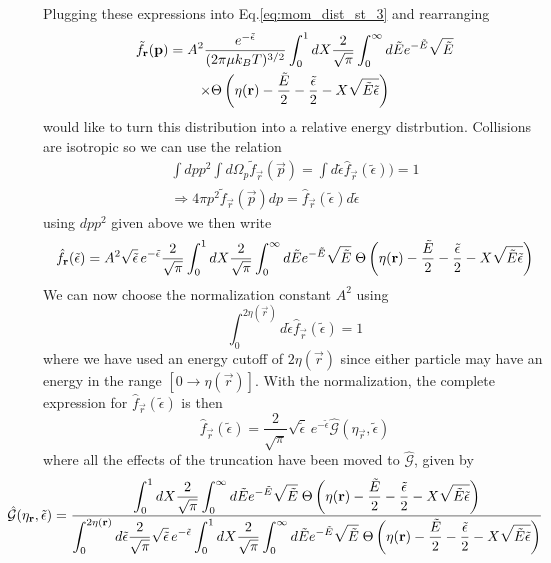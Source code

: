 Plugging these expressions into Eq.\ref{eq:mom_dist_st_3} and rearranging
\begin{multline}
	\tilde{f}_{\mathbf{r}}(\mathbf{p}) = A^2 \frac{e^{-\tilde{\epsilon}}}{(2 \pi \mu k_B T)^{3/2}} \int_0^1 dX \frac{2}{\sqrt{\pi}} \int_0^\infty d \tilde{E} e^{-\tilde{E}}\sqrt{\tilde{E}} \\
	\times \Theta \left( {\eta(\mathbf{r}) - \frac{\tilde{E}}{2} - \frac{\tilde{\epsilon}}{2} - X \sqrt{\tilde{E}\tilde{\epsilon}}} \right)
\end{multline}
would like to turn this distribution into a relative energy distrbution. 
Collisions are isotropic so we can use the relation
\begin{equation}
\begin{split}
	\int dp p^2 \int d \Omega_p \tilde{f}_{\vec{r}}(\vec{p}) = \int d \tilde{\epsilon} \hat{f}_{\vec{r}}(\tilde{\epsilon})) = 1 \\
	\Rightarrow 4 \pi p^2 \tilde{f}_{\vec{r}}(\vec{p}) dp = \hat{f}_{\vec{r}}(\tilde{\epsilon}) d \tilde{\epsilon}
\end{split}
\end{equation}
using $dp p^2$ given above we then write 
\begin{equation} \label{eq:mom_dist_st_4}
	\hat{f}_{\mathbf{r}}(\tilde{\epsilon}) = A^2 \sqrt{\tilde{\epsilon}} \, e^{-\tilde{\epsilon}} \frac{2}{\sqrt{\pi}} \int_0^1 dX \frac{2}{\sqrt{\pi}} \int_0^\infty d \tilde{E} e^{-\tilde{E}}\sqrt{\tilde{E}} \; \Theta \left( {\eta(\mathbf{r}) - \frac{\tilde{E}}{2} - \frac{\tilde{\epsilon}}{2} - X \sqrt{\tilde{E}\tilde{\epsilon}}} \right)
\end{equation}
We can now choose the normalization constant $A^2$ using
\begin{equation*}
	\int_0^{2\eta(\vec{r})} d \tilde{\epsilon} \hat{f}_{\vec{r}}(\tilde{\epsilon}) = 1
\end{equation*}
where we have used an energy cutoff of $2 \eta(\vec{r})$ since either particle may have an energy in the range $[0 \rightarrow \eta(\vec{r})]$. 
With the normalization, the complete expression for $\hat{f}_{\vec{r}}(\tilde{\epsilon})$ is then
\begin{equation}
	\hat{f}_{\vec{r}}(\tilde{\epsilon}) = \frac{2}{\sqrt{\pi}} \sqrt{\tilde{\epsilon}} \, e^{-\tilde{\epsilon}} \hat{\mathcal{G}}(\eta_{\vec{r}}, \tilde{\epsilon})
\end{equation}
where all the effects of the truncation have been moved to $\hat{\mathcal{G}}$, given by 
\begin{equation} \label{eq:truncWeighting}
\hspace*{-1cm} 
	\hat{\mathcal{G}}(\eta_{\vec{r}}, \tilde{\epsilon}) = \frac{\displaystyle
	\int_0^1 dX \frac{2}{\sqrt{\pi}} \int_0^\infty d \tilde{E} e^{-\tilde{E}}\sqrt{\tilde{E}} \; \heaviside{\eta(\vec{r}) - \frac{\tilde{E}}{2} - \frac{\tilde{\epsilon}}{2} - X \sqrt{\tilde{E}\tilde{\epsilon}}}}
	{\displaystyle \int_0^{2\eta(\vec{r})} d \tilde{\epsilon} \frac{2}{\sqrt{\pi}} \sqrt{\tilde{\epsilon}} \, e^{-\tilde{\epsilon}} \int_0^1 dX \frac{2}{\sqrt{\pi}} \int_0^\infty d \tilde{E} e^{-\tilde{E}}\sqrt{\tilde{E}} \; \heaviside{\eta(\vec{r}) - \frac{\tilde{E}}{2} - \frac{\tilde{\epsilon}}{2} - X \sqrt{\tilde{E}\tilde{\epsilon}}}}
\end{equation}
